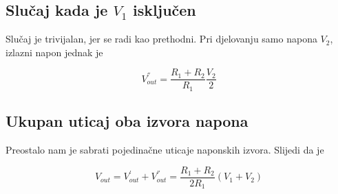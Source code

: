 \documentclass[11pt]{article}
\begin{document}
            \subsection{Slučaj kada je $V_1$ isključen}

                Slučaj je trivijalan, jer se radi kao prethodni. Pri djelovanju samo napona $V_2$, izlazni napon jednak je

                \begin{equation}
                    V^{''}_{out} = \frac{R_1 + R_2}{R_1} \frac{V_2}{2}
                \end{equation}

            \subsection{Ukupan uticaj oba izvora napona}
            
                Preostalo nam je sabrati pojedinačne uticaje naponskih izvora. Slijedi da je

                \begin{equation}
                    V_{out} = V^{'}_{out} + V^{''}_{out} = \frac{R_1+R_2}{2R_1} \left(V_1 + V_2\right)
                \end{equation}
\end{document}
